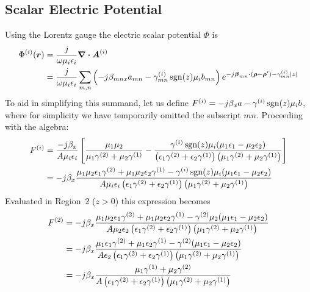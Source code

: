 \subsection{Scalar Electric Potential}
Using the Lorentz gauge the electric scalar potential $\Phi$ is
\begin{align}
  \Phi^{(i)}(\boldsymbol{r}) &= \frac{j}{\omega \mu_i \epsilon_i} \boldsymbol{\nabla} \boldsymbol{\cdot} \boldsymbol{A}^{(i)}
  \nonumber \\
  &= \frac{j}{\omega\mu_i\epsilon_i} \sum_{m,n}
  \left(
    -j\beta_{mnx} a_{mn} - \gamma^{(i)}_{mn} \operatorname{sgn}(z) \mu_i b_{mn}
  \right)
  e^{-j\boldsymbol{\beta}_{mn} \boldsymbol{\cdot} (\boldsymbol{\rho}-\boldsymbol{\rho}') - \gamma^{(i)}_{mn} \lvert z\rvert}
\end{align}
To aid in simplifying this summand, let us define $F^{(i)} = 
-j\beta_{x} a - \gamma^{(i)} \operatorname{sgn}(z) \mu_i b$, where for simplicity we
have temporarily omitted the subscript $mn$. Proceeding with the
algebra:
\begin{align}
  F\eye &=
  \frac{-j\beta_x}{A\mu_i\epsilon_i} 
  \left[
  \frac{\mu_1\mu_2}{\mu_1\gamma\two+\mu_2\gamma\one}
  - 
  \frac{\gamma\eye \sgn(z) \mu_i(\mu_1\epsilon_1 - \mu_2\epsilon_2)}%
  {\left(\epsilon_1\gamma\two+\epsilon_2\gamma\one\right)
    \left(\mu_1\gamma\two+\mu_2\gamma\one\right) }
  \right]  \nonumber \\
  &= -j\beta_x
  \frac{\mu_1\mu_2\epsilon_1\gamma\two+\mu_1\mu_2\epsilon_2\gamma\one
        -\gamma\eye \sgn(z) \mu_i(\mu_1\epsilon_1 - \mu_2\epsilon_2)}%
  {A\mu_i\epsilon_i
    \left(\epsilon_1\gamma\two+\epsilon_2\gamma\one\right)
    \left(\mu_1\gamma\two+\mu_2\gamma\one\right) }
\end{align}
Evaluated in Region~2 ($z>0$) this expression becomes
\begin{align}
  F\two &=-j\beta_x
  \frac{\mu_1\mu_2\epsilon_1\gamma\two+\mu_1\mu_2\epsilon_2\gamma\one
        -\gamma\two \mu_2(\mu_1\epsilon_1 - \mu_2\epsilon_2)}%
  {A\mu_2\epsilon_2
    \left(\epsilon_1\gamma\two+\epsilon_2\gamma\one\right)
    \left(\mu_1\gamma\two+\mu_2\gamma\one\right) } \nonumber \\
  &=-j\beta_x
  \frac{\mu_1\epsilon_1\gamma\two+\mu_1\epsilon_2\gamma\one
        -\gamma\two (\mu_1\epsilon_1 - \mu_2\epsilon_2)}%
  {A\epsilon_2
    \left(\epsilon_1\gamma\two+\epsilon_2\gamma\one\right)
    \left(\mu_1\gamma\two+\mu_2\gamma\one\right) } \nonumber \\
  &=-j\beta_x
  \frac{\mu_1\gamma\one
         + \mu_2\gamma\two}%
  {A
    \left(\epsilon_1\gamma\two+\epsilon_2\gamma\one\right)
    \left(\mu_1\gamma\two+\mu_2\gamma\one\right) } 
\end{align}
